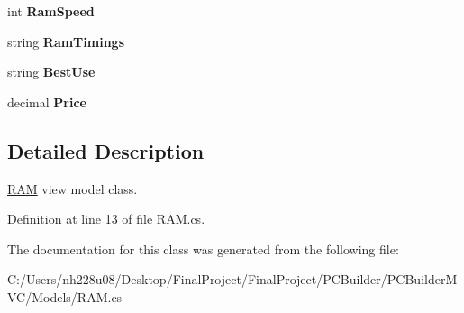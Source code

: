 \begin{DoxyCompactItemize}
\item 
int {\bfseries Ram\+Speed}\hypertarget{class_p_c_builder_m_v_c_1_1_models_1_1_r_a_m_a8e313dcf0e5da516445d62e8a563e6b7}{}\label{class_p_c_builder_m_v_c_1_1_models_1_1_r_a_m_a8e313dcf0e5da516445d62e8a563e6b7}

\item 
string {\bfseries Ram\+Timings}\hypertarget{class_p_c_builder_m_v_c_1_1_models_1_1_r_a_m_a09f3174de6c2f12bfa47881b4e82a437}{}\label{class_p_c_builder_m_v_c_1_1_models_1_1_r_a_m_a09f3174de6c2f12bfa47881b4e82a437}

\item 
string {\bfseries Best\+Use}\hypertarget{class_p_c_builder_m_v_c_1_1_models_1_1_r_a_m_a560148297a0398a0db002931bad4a7f9}{}\label{class_p_c_builder_m_v_c_1_1_models_1_1_r_a_m_a560148297a0398a0db002931bad4a7f9}

\item 
decimal {\bfseries Price}\hypertarget{class_p_c_builder_m_v_c_1_1_models_1_1_r_a_m_af0b205913d3954d18435e796d727eb39}{}\label{class_p_c_builder_m_v_c_1_1_models_1_1_r_a_m_af0b205913d3954d18435e796d727eb39}

\end{DoxyCompactItemize}


\subsection{Detailed Description}
\hyperlink{class_p_c_builder_m_v_c_1_1_models_1_1_r_a_m}{R\+AM} view model class. 



Definition at line 13 of file R\+A\+M.\+cs.



The documentation for this class was generated from the following file\+:\begin{DoxyCompactItemize}
\item 
C\+:/\+Users/nh228u08/\+Desktop/\+Final\+Project/\+Final\+Project/\+P\+C\+Builder/\+P\+C\+Builder\+M\+V\+C/\+Models/R\+A\+M.\+cs\end{DoxyCompactItemize}
